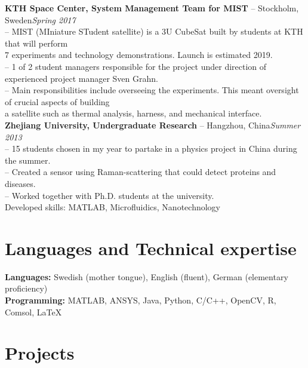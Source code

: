 \documentclass[10pt]{article}
\begin{document}
\noindent\textbf{KTH Space Center, System Management Team for MIST} -- Stockholm, Sweden\hfill\textit{Spring 2017}\\
\indent-- MIST (MIniature STudent satellite) is a 3U CubeSat built by students at KTH that will perform\\\indent\hspace{0.2cm} 7 experiments and technology demonstrations. Launch is estimated 2019.\\
\indent-- 1 of 2 student managers responsible for the project under direction of experienced project manager Sven Grahn.\\
\indent-- Main responsibilities include overseeing the experiments. This meant oversight of crucial aspects of building \\\indent\hspace{0.2cm}a satellite such as thermal analysis, harness, and mechanical interface.\\

\noindent\textbf{Zhejiang University, Undergraduate Research} -- Hangzhou, China\hfill\textit{Summer 2013}\\
\indent-- 15 students chosen in my year to partake in a physics project in China during the summer.\\
\indent-- Created a sensor using Raman-scattering that could detect proteins and diseases.\\
\indent-- Worked together with Ph.D. students at the university.\\
\indent Developed skills: MATLAB, Microfluidics, Nanotechnology\\

\section*{Languages and Technical expertise}
\vspace{0.2em}
\hline
\vspace{0.5em}
\noindent\textbf{Languages:} Swedish (mother tongue), English (fluent), German (elementary proficiency)\\
\textbf{Programming:} MATLAB, ANSYS, Java, Python, C{/}C++, OpenCV, R, Comsol, \LaTeX\\

\section*{Projects}
\vspace{0.1em}
\hline
\vspace{0.3em}
\end{document}
